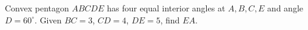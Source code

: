 Convex pentagon $ABCDE$ has four equal interior angles at $A,B,C,E$ and angle $D=60^\circ$. Given $BC=3$, $CD=4$, $DE=5$, find $EA$.
